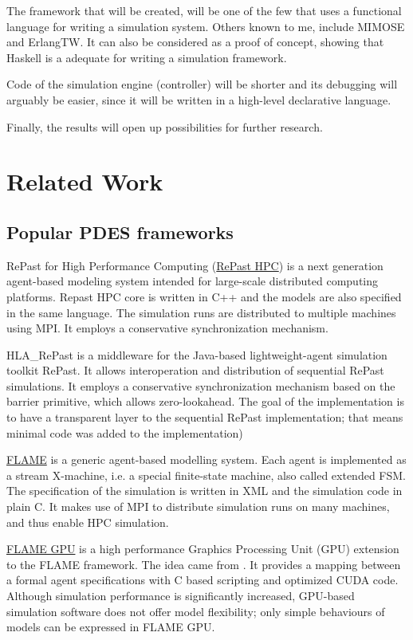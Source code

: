 \documentclass[a4paper]{article}
\begin{document}
The framework that will be created, will be one of the few that uses
a functional language for writing a simulation system. Others known to me, include
MIMOSE\cite{moehring_social_1996} and ErlangTW\cite{toscano_parallel_2012}.
It can also be considered as a proof of concept, showing that
Haskell is a adequate for writing a simulation framework.

Code of the simulation engine (controller) will be shorter and its debugging
will arguably be easier, since it will be written in a high-level declarative language. 

Finally, the results will open up possibilities for further research.

\section{Related Work}


\subsection{Popular PDES frameworks}

RePast for High Performance Computing (\href{http://repast.sourceforge.net/repast_hpc.html}{RePast HPC}) is a next generation agent-based modeling system intended for large-scale distributed computing platforms. Repast HPC core is written in C++ and the models are also specified in the same language. 
The simulation runs are distributed to multiple machines using MPI. It
employs a conservative synchronization mechanism.

HLA\_RePast\cite{minson_distributing_2004} is a middleware for
the Java-based lightweight-agent simulation toolkit RePast. It allows interoperation and distribution of sequential RePast simulations. It employs a conservative synchronization mechanism based on the barrier primitive, which allows zero-lookahead. The goal of the implementation is to have a transparent
layer to the sequential RePast implementation; that means minimal code was added to the implementation)

\href{http://www.flame.ac.uk/}{FLAME} is a generic agent-based modelling system. Each agent is implemented as a stream X-machine, i.e. a special finite-state machine, also called extended FSM.
The specification of the simulation is written in XML and the simulation code in plain C.
It makes use of MPI to distribute simulation runs on many machines, and thus enable HPC simulation.

\href{http://flamegpu.com/}{FLAME GPU} is a high performance Graphics Processing Unit (GPU) extension to the FLAME framework. The idea came from \cite{dsouza_sugarscape_2007}. It provides a mapping between a formal agent specifications with C based scripting and optimized CUDA code. 
Although simulation performance is significantly increased, GPU-based simulation software does not offer model flexibility; only simple behaviours of models can be expressed in FLAME GPU.
\end{document}
